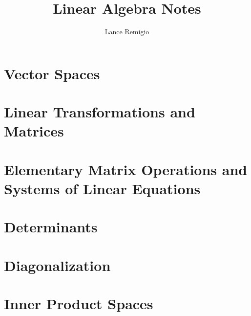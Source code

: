 \documentclass[11pt,a4paper]{book}
\title{Linear Algebra Notes}
\author{Lance Remigio}
\begin{document}
\maketitle
\tableofcontents
\listoftheorems[ignoreall,show={theorem,defn}]
\chapter{Vector Spaces}











\chapter{Linear Transformations and Matrices}











\chapter{Elementary Matrix Operations and Systems of Linear Equations}





\chapter{Determinants}







\chapter{Diagonalization}





\chapter{Inner Product Spaces}








\end{document}
